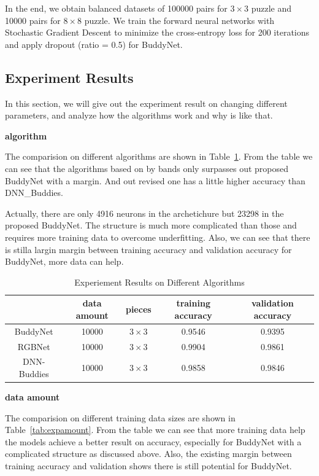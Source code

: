 \documentclass{article}
\begin{document}
In the end, we obtain balanced datasets of 100000 pairs for $3\times 3$ puzzle and 10000 pairs for  $8\times 8$ puzzle. We train the forward neural networks with Stochastic Gradient Descent to minimize the cross-entropy loss for 200 iterations and apply dropout (ratio = 0.5) for BuddyNet.

\subsection{Experiment Results}

In this section, we will give out the experiment result on changing different parameters, and analyze how the algorithms work and why is like that.

\textbf{algorithm}

The comparision on different algorithms are shown in Table~\ref{tab:expalg}. From the table we can see that the algorithms based on by bands only surpasses out proposed BuddyNet with a margin. And out revised one has a little higher accuracy than DNN\_Buddies\cite{sholomon2016dnn}.

Actually, there are only 4916 neurons in the archetichure but 23298 in the proposed BuddyNet. The structure is much more complicated than those and requires more training data to overcome underfitting. Also, we can see that there is stilla largin margin between training accuracy and validation accuracy for BuddyNet, more data can help.

\begin{table}
    \caption{Experiement Results on Different Algorithms}
    \centering
    \label{tab:expalg}
    \begin{tabular}{c|c|c|c|c}
        \hline
        & data amount & pieces & training accuracy & validation accuracy\\
        \hline
        BuddyNet & 10000 & $3\times 3$ & 0.9546 & 0.9395\\
        \hline
        RGBNet & 10000 & $3\times 3$ & 0.9904 & 0.9861\\
        \hline
        \hline
        DNN-Buddies \cite{sholomon2016dnn} & 10000 & $3\times 3$ & 0.9858 & 0.9846\\
        \hline
    \end{tabular}
\end{table}

\textbf{data amount}

The comparision on different training data sizes are shown in Table~\ref{tab:expamount}. From the table we can see that more training data help the models achieve a better result on accuracy, especially for BuddyNet with a complicated structure as discussed above. Also, the existing margin between training accuracy and validation shows there is still potential for BuddyNet.
\end{document}
